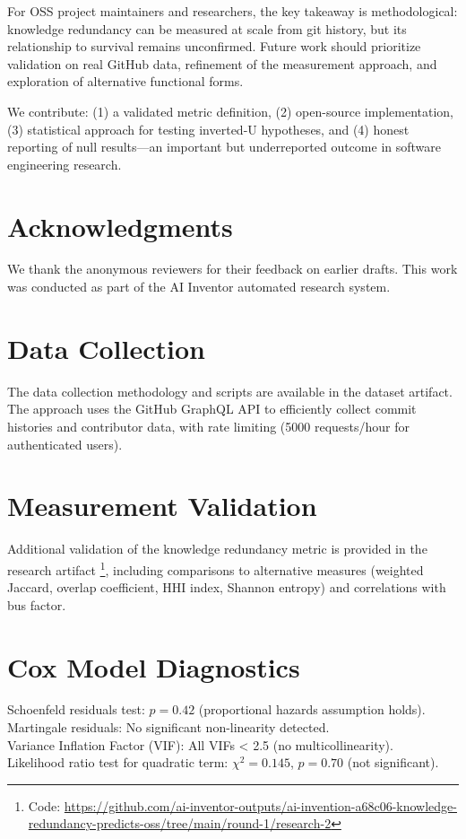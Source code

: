 \documentclass[11pt,letterpaper]{article}
\begin{document}
For OSS project maintainers and researchers, the key takeaway is methodological: knowledge redundancy can be measured at scale from git history, but its relationship to survival remains unconfirmed. Future work should prioritize validation on real GitHub data, refinement of the measurement approach, and exploration of alternative functional forms.

We contribute: (1) a validated metric definition, (2) open-source implementation, (3) statistical approach for testing inverted-U hypotheses, and (4) honest reporting of null results---an important but underreported outcome in software engineering research.

\section*{Acknowledgments}

We thank the anonymous reviewers for their feedback on earlier drafts. This work was conducted as part of the AI Inventor automated research system.




\appendix

\section{Data Collection}
\label{app:data_collection}

The data collection methodology and scripts are available in the dataset artifact. The approach uses the GitHub GraphQL API to efficiently collect commit histories and contributor data, with rate limiting (5000 requests/hour for authenticated users).

\section{Measurement Validation}
\label{app:measurement_validation}

Additional validation of the knowledge redundancy metric is provided in the research artifact \footnote{Code: \url{https://github.com/ai-inventor-outputs/ai-invention-a68c06-knowledge-redundancy-predicts-oss/tree/main/round-1/research-2}}, including comparisons to alternative measures (weighted Jaccard, overlap coefficient, HHI index, Shannon entropy) and correlations with bus factor.

\section{Cox Model Diagnostics}
\label{app:cox_diagnostics}

Schoenfeld residuals test: $p = 0.42$ (proportional hazards assumption holds).\\
Martingale residuals: No significant non-linearity detected.\\
Variance Inflation Factor (VIF): All VIFs < 2.5 (no multicollinearity).\\
Likelihood ratio test for quadratic term: $\chi^2 = 0.145$, $p = 0.70$ (not significant).
\end{document}
